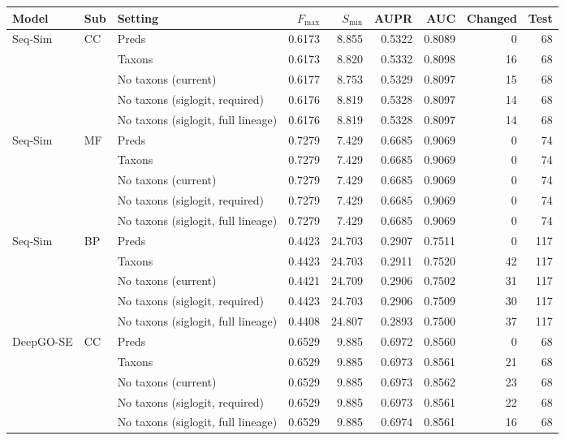 \begin{tabular}{lllrrrrrr}
\toprule
Model & Sub & Setting & $F_{\max}$ & $S_{\min}$ & AUPR & AUC & Changed & Test \\
\midrule
Seq-Sim & CC & Preds & 0.6173 & 8.855 & 0.5322 & 0.8089 & 0 & 68 \\
 &  & Taxons & 0.6173 & 8.820 & 0.5332 & 0.8098 & 16 & 68 \\
 &  & No taxons (current) & 0.6177 & 8.753 & 0.5329 & 0.8097 & 15 & 68 \\
 &  & No taxons (siglogit, required) & 0.6176 & 8.819 & 0.5328 & 0.8097 & 14 & 68 \\
 &  & No taxons (siglogit, full lineage) & 0.6176 & 8.819 & 0.5328 & 0.8097 & 14 & 68 \\
\addlinespace
Seq-Sim & MF & Preds & 0.7279 & 7.429 & 0.6685 & 0.9069 & 0 & 74 \\
 &  & Taxons & 0.7279 & 7.429 & 0.6685 & 0.9069 & 0 & 74 \\
 &  & No taxons (current) & 0.7279 & 7.429 & 0.6685 & 0.9069 & 0 & 74 \\
 &  & No taxons (siglogit, required) & 0.7279 & 7.429 & 0.6685 & 0.9069 & 0 & 74 \\
 &  & No taxons (siglogit, full lineage) & 0.7279 & 7.429 & 0.6685 & 0.9069 & 0 & 74 \\
\addlinespace
Seq-Sim & BP & Preds & 0.4423 & 24.703 & 0.2907 & 0.7511 & 0 & 117 \\
 &  & Taxons & 0.4423 & 24.703 & 0.2911 & 0.7520 & 42 & 117 \\
 &  & No taxons (current) & 0.4421 & 24.709 & 0.2906 & 0.7502 & 31 & 117 \\
 &  & No taxons (siglogit, required) & 0.4423 & 24.703 & 0.2906 & 0.7509 & 30 & 117 \\
 &  & No taxons (siglogit, full lineage) & 0.4408 & 24.807 & 0.2893 & 0.7500 & 37 & 117 \\
\midrule
DeepGO-SE & CC & Preds & 0.6529 & 9.885 & 0.6972 & 0.8560 & 0 & 68 \\
 &  & Taxons & 0.6529 & 9.885 & 0.6973 & 0.8561 & 21 & 68 \\
 &  & No taxons (current) & 0.6529 & 9.885 & 0.6973 & 0.8562 & 23 & 68 \\
 &  & No taxons (siglogit, required) & 0.6529 & 9.885 & 0.6973 & 0.8561 & 22 & 68 \\
 &  & No taxons (siglogit, full lineage) & 0.6529 & 9.885 & 0.6974 & 0.8561 & 16 & 68 \\

\end{tabular}
